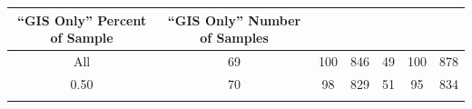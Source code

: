 \documentclass[11pt,]{article}
\begin{document}
\begin{longtable}[c]{@{}ccccccc@{}}
\begin{minipage}[b]{0.13\columnwidth}
``GIS Only'' Percent of Sample
\strut\end{minipage} &
\begin{minipage}[b]{0.13\columnwidth}\centering\strut
``GIS Only'' Number of Samples
\strut\end{minipage}\tabularnewline
\midrule
\endhead
\begin{minipage}[t]{0.08\columnwidth}\centering\strut
All
\strut\end{minipage} &
\begin{minipage}[t]{0.11\columnwidth}\centering\strut
69
\strut\end{minipage} &
\begin{minipage}[t]{0.13\columnwidth}\centering\strut
100
\strut\end{minipage} &
\begin{minipage}[t]{0.13\columnwidth}\centering\strut
846
\strut\end{minipage} &
\begin{minipage}[t]{0.11\columnwidth}\centering\strut
49
\strut\end{minipage} &
\begin{minipage}[t]{0.13\columnwidth}\centering\strut
100
\strut\end{minipage} &
\begin{minipage}[t]{0.13\columnwidth}\centering\strut
878
\strut\end{minipage}\tabularnewline
\begin{minipage}[t]{0.08\columnwidth}\centering\strut
0.50
\strut\end{minipage} &
\begin{minipage}[t]{0.11\columnwidth}\centering\strut
70
\strut\end{minipage} &
\begin{minipage}[t]{0.13\columnwidth}\centering\strut
98
\strut\end{minipage} &
\begin{minipage}[t]{0.13\columnwidth}\centering\strut
829
\strut\end{minipage} &
\begin{minipage}[t]{0.11\columnwidth}\centering\strut
51
\strut\end{minipage} &
\begin{minipage}[t]{0.13\columnwidth}\centering\strut
95
\strut\end{minipage} &
\begin{minipage}[t]{0.13\columnwidth}\centering\strut
834
\strut\end{minipage}\tabularnewline
\begin{minipage}[t]{0.08\columnwidth}\centering\strut

\end{minipage}
\end{longtable}
\end{document}
